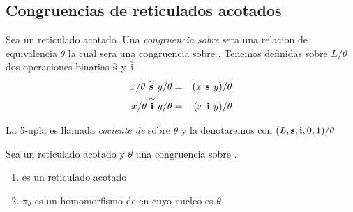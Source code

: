   \subsection{Congruencias de reticulados acotados}
  \begin{definition}
    Sea \reticulAcot un reticulado acotado. Una \emph{congruencia sobre} \reticulAcot sera una
    relacion de equivalencia $\theta$ la cual sera una congruencia sobre \reticulAlg. Tenemos definidas sobre
    $L/\theta$ dos operaciones binarias $\overset{\sim}{\textbf{s}}$ y $\overset{\sim}{\text{i}}$
    \begin{alignat*}{2}
      x/\theta\overset{\sim}{\textbf{ s }}y/\theta &=& (x\textbf{ s }y)/\theta\\
      x/\theta\overset{\sim}{\textbf{ i }}y/\theta &=& (x\textbf{ i }y)/\theta
    \end{alignat*}

    La 5-upla  es llamada
    \emph{cociente de} \reticulAcot sobre $\theta$ y la denotaremos con $(L, \textbf{s}, \textbf{i}, 0, 1)/\theta$
  \end{definition}

  \begin{lemma}
    Sea \reticulAcot un reticulado acotado y $\theta$ una congruencia sobre \reticulAcot.
    \begin{enumerate}
      \item {} es un reticulado acotado
      \item $\pi_\theta$ es un homomorfismo de \reticulAcot en  cuyo nucleo es $\theta$
    \end{enumerate}
  \end{lemma}

